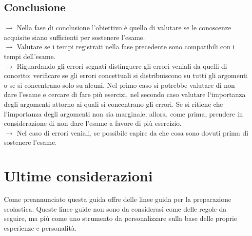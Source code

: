 \documentclass[11pt,a4paper]{article}
\begin{document}
\subsection{Conclusione}
$\rightarrow$ Nella fase di conclusione l'obiettivo è quello di valutare se le conoscenze acquisite siano sufficienti per sostenere l'esame. \\
$\rightarrow$ Valutare se i tempi registrati nella fase precedente sono compatibili con i tempi dell'esame.\\
$\rightarrow$ Riguardando gli errori segnati distinguere gli errori veniali da quelli di concetto; verificare se gli errori concettuali si distribuiscono su tutti gli argomenti o se si concentrano solo su alcuni.  Nel primo caso si potrebbe valutare di non dare l'esame e cercare di fare più esercizi, nel secondo caso valutare l`importanza degli argomenti attorno ai quali si concentrano gli errori. Se si ritiene che l'importanza degli argomenti non sia marginale, allora, come prima, prendere in considerazione di non dare l'esame a favore di più esercizio.\\
$\rightarrow$ Nel caso di errori veniali, se possibile capire da che cosa sono dovuti prima di sostenere l'esame.\\

\section{Ultime considerazioni}
Come preannunciato questa guida offre delle linee guida per la preparazione scolastica. Queste linee guide non sono da considerasi come delle regole da seguire, ma più come uno strumento da personalizzare sulla base delle proprie esperienze e personalità. \\
	
\end{document}
